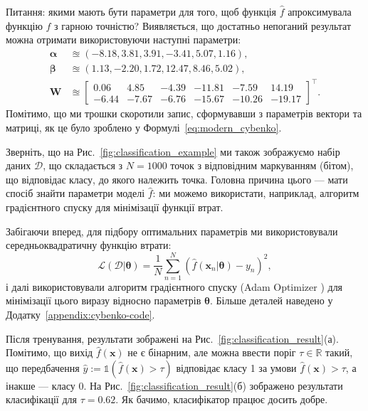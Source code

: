 \begin{example}
	Питання: якими мають бути параметри для того, щоб функція $\hat{f}$
	апроксимувала функцію $f$ з гарною точністю? Виявляється, що достатньо
	непоганий результат можна отримати використовуючи наступні параметри:
	\begin{align*}
		\boldsymbol{\alpha} &\approxeq (-8.18, 3.81, 3.91, -3.41, 5.07, 1.16), \\
		\boldsymbol{\beta} &\approxeq (1.13, -2.20, 1.72, 12.47, 8.46, 5.02), \\
		\boldsymbol{W} &\approxeq \begin{bmatrix}
			0.06 & 4.85 & -4.39 & -11.81 & -7.59 & 14.19 \\
			-6.44 & -7.67 & -6.76 & -15.67 & -10.26 & -19.17
		\end{bmatrix}^{\top}.
	\end{align*}
	Помітимо, що ми трошки скоротили запис, сформувавши з параметрів вектори та
	матриці, як це було зроблено у Формулі~\ref{eq:modern_cybenko}.
\end{example}

Зверніть, що на Рис.~\ref{fig:classification_example} ми також зображуємо набір
даних $\mathcal{D}$, що складається з $N=1000$ точок з відповідним маркуванням
(бітом), що відповідає класу, до якого належить точка. Головна причина цього ---
мати спосіб знайти параметри моделі $\hat{f}$: ми можемо використати, наприклад,
алгоритм градієнтного спуску для мінімізації функції втрат. 

\begin{remark}
	Забігаючи вперед, для підбору оптимальних параметрів ми використовували
	середньоквадратичну функцію втрати:
	\begin{equation*}
		\mathcal{L}(\mathcal{D}|\boldsymbol{\theta}) = \frac{1}{N}\sum_{n=1}^N \left(\hat{f}(\mathbf{x}_n|\boldsymbol{\theta}) - y_n\right)^2,
	\end{equation*}
	і далі використовували алгоритм градієнтного спуску (Adam Optimizer \cite{adam}) для мінімізації цього виразу відносно параметрів $\boldsymbol{\theta}$. Більше деталей наведено у Додатку~\ref{appendix:cybenko-code}.
\end{remark}

Після тренування, результати зображені на
Рис.~\ref{fig:classification_result}(а). Помітимо, що вихід
$\hat{f}(\mathbf{x})$ не є бінарним, але можна ввести поріг $\tau \in
\mathbb{R}$ такий, що передбачення $\hat{y} := \mathds{1}(\hat{f}(\mathbf{x}) >
\tau)$ відповідає класу 1 за умови $\hat{f}(\mathbf{x}) > \tau$, а інакше ---
класу 0. На Рис.~\ref{fig:classification_result}(б) зображено результати
класифікації для $\tau=0.62$. Як бачимо, класифікатор працює досить добре.

